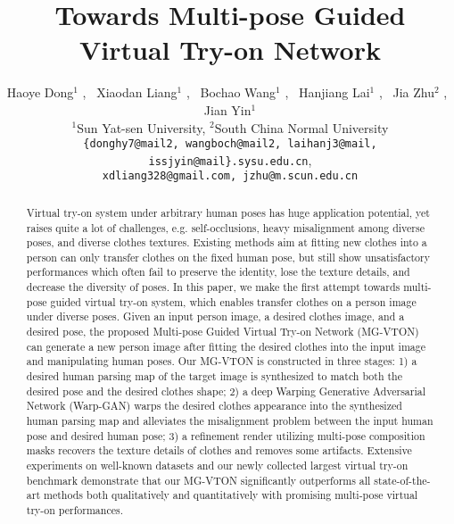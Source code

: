 \documentclass[10pt,twocolumn,letterpaper]{article}
\begin{document}
\title{Towards Multi-pose Guided Virtual Try-on Network}



\author{
Haoye Dong$^{1}$ ,~ Xiaodan Liang$^{1}$ ,~ Bochao Wang$^1$ ,~ Hanjiang Lai$^{1}$ ,~ Jia Zhu$^2$ ,~ Jian Yin$^{1}$\\
$^1$Sun Yat-sen University,  $^2$South China Normal University\\
{\tt\small \{donghy7@mail2, wangboch@mail2, laihanj3@mail, issjyin@mail\}.sysu.edu.cn}, \\
{\tt\small xdliang328@gmail.com, jzhu@m.scun.edu.cn}
}

\maketitle


\begin{abstract}
   Virtual try-on system under arbitrary human poses has huge application potential, yet raises quite a lot of challenges, e.g. self-occlusions, heavy misalignment among diverse poses, and diverse clothes textures. Existing methods aim at fitting new clothes into a person can only transfer clothes on the fixed human pose, but still show unsatisfactory performances which often fail to preserve the identity, lose the texture details, and decrease the diversity of poses. In this paper, we make the first attempt towards multi-pose guided virtual try-on system, which enables transfer clothes on a person image under diverse poses. Given an input person image, a desired clothes image, and a desired pose, the proposed Multi-pose Guided Virtual Try-on Network (MG-VTON) can generate a new person image after fitting the desired clothes into the input image and manipulating human poses. Our MG-VTON is constructed in three stages: 1) a desired human parsing map of the target image is synthesized to match both the desired pose and the desired clothes shape; 2) a deep Warping Generative Adversarial Network (Warp-GAN) warps the desired clothes appearance into the synthesized human parsing map and alleviates the misalignment problem between the input human pose and desired human pose; 3) a refinement render utilizing multi-pose composition masks recovers the texture details of clothes and removes some artifacts. Extensive experiments on well-known datasets and our newly collected largest virtual try-on benchmark demonstrate that our MG-VTON significantly outperforms all state-of-the-art methods both qualitatively and quantitatively with promising multi-pose virtual try-on performances.
\end{abstract}
\end{document}

